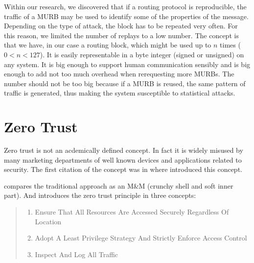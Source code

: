 Within our research, we discovered that if a routing protocol is reproducible, the traffic of a MURB may be used to identify some of the properties of the message. Depending on the type of attack, the block has to be repeated very often. For this reason, we limited the number of replays to a low number. The concept is that we have, in our case a routing block, which might be used up to $n$ times ($0<n<127$). It is easily representable in a byte integer (signed or unsigned) on any system. It is big enough to support human communication sensibly and is big enough to add not too much overhead when rerequesting more MURBs. The number should not be too big because if a MURB is reused, the same pattern of traffic is generated, thus making the system susceptible to statistical attacks.

\section{Zero Trust\label{sec:zeroTrust}}
Zero trust is not an acdemically defined concept. In fact it is widely misused by many marketing departments of well known devices and applications related to security. The first citation of the concept was in \cite{kindervag2010no} where \citeauthor{kindervag2010no} introduced this concept.

\citeauthor{kindervag2010no} compares the traditional approach as an M\&M (crunchy shell and soft inner part). And introduces the zero trust principle in three concepts:
\begin{quote}
	\begin{enumerate}
		\item Ensure That All Resources Are Accessed Securely Regardless Of Location
		\item Adopt A Least Privilege Strategy And Strictly Enforce Access Control
		\item Inspect And Log All Traffic
	\end{enumerate}
\end{quote}

